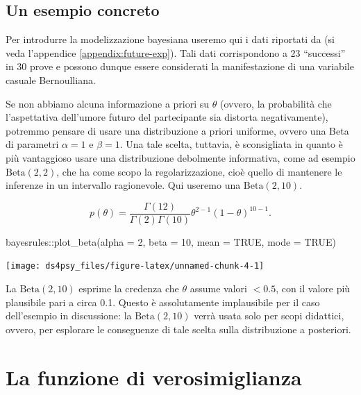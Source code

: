 \documentclass[
  11pt,
]{krantz}
\makeatletter
\newenvironment{Shaded}{\begin{snugshade}}{\end{snugshade}}
\newcommand{\AttributeTok}[1]{\textcolor[rgb]{0.61,0.61,0.61}{#1}}
\newcommand{\ConstantTok}[1]{\textcolor[rgb]{0,0,0}{#1}}
\newcommand{\DecValTok}[1]{\textcolor[rgb]{0.06,0.06,0.06}{#1}}
\newcommand{\FunctionTok}[1]{\textcolor[rgb]{0,0,0}{#1}}
\newcommand{\NormalTok}[1]{#1}
\newcommand{\SpecialCharTok}[1]{\textcolor[rgb]{0,0,0}{#1}}
\newenvironment{kframe}{%
\medskip{}
\setlength{\fboxsep}{.8em}
 \def\at@end@of@kframe{}%
 \ifinner\ifhmode%
  \def\at@end@of@kframe{\end{minipage}}%
  \begin{minipage}{\columnwidth}%
 \fi\fi%
 \def\FrameCommand##1{\hskip\@totalleftmargin \hskip-\fboxsep
 \colorbox{shadecolor}{##1}\hskip-\fboxsep
     \hskip-\linewidth \hskip-\@totalleftmargin \hskip\columnwidth}%
 \MakeFramed {\advance\hsize-\width
   \@totalleftmargin\z@ \linewidth\hsize
   \@setminipage}}%
 {\par\unskip\endMakeFramed%
 \at@end@of@kframe}
\renewenvironment{Shaded}{\begin{kframe}}{\end{kframe}}
\theoremstyle{definition}
\theoremstyle{definition}
\theoremstyle{definition}
\theoremstyle{definition}
\theoremstyle{remark}
\makeatother
\begin{document}
\hypertarget{un-esempio-concreto}{%
\subsection{Un esempio concreto}\label{un-esempio-concreto}}

Per introdurre la modelizzazione bayesiana useremo qui i dati riportati da \citet{zetschefuture2019} (si veda l'appendice \ref{appendix:future-exp}). Tali dati corrispondono a 23 ``successi'' in 30 prove e possono dunque essere considerati la manifestazione di una variabile casuale Bernoulliana.

Se non abbiamo alcuna informazione a priori su \(\theta\) (ovvero, la probabilità che l'aspettativa dell'umore futuro del partecipante sia distorta negativamente), potremmo pensare di usare una distribuzione a priori uniforme, ovvero una Beta di parametri \(\alpha=1\) e \(\beta=1\). Una tale scelta, tuttavia, è sconsigliata in quanto è più vantaggioso usare una distribuzione debolmente informativa, come ad esempio \(\mbox{Beta}(2, 2)\), che ha come scopo la regolarizzazione, cioè quello di mantenere le inferenze in un intervallo ragionevole. Qui useremo una \(\mbox{Beta}(2, 10)\).

\[
p(\theta) = \frac{\Gamma(12)}{\Gamma(2)\Gamma(10)}\theta^{2-1} (1-\theta)^{10-1}.
\]

\begin{Shaded}
\begin{Highlighting}[]
\NormalTok{bayesrules}\SpecialCharTok{::}\FunctionTok{plot\_beta}\NormalTok{(}\AttributeTok{alpha =} \DecValTok{2}\NormalTok{, }\AttributeTok{beta =} \DecValTok{10}\NormalTok{, }\AttributeTok{mean =} \ConstantTok{TRUE}\NormalTok{, }\AttributeTok{mode =} \ConstantTok{TRUE}\NormalTok{)}
\end{Highlighting}
\end{Shaded}

\begin{center}\texttt{[image: ds4psy\_files/figure-latex/unnamed-chunk-4-1]} \end{center}

La \(\mbox{Beta}(2, 10)\) esprime la credenza che \(\theta\) assume valori \(< 0.5\), con il valore più plausibile pari a circa 0.1. Questo è assolutamente implausibile per il caso dell'esempio in discussione: la \(\mbox{Beta}(2, 10)\) verrà usata solo per scopi didattici, ovvero, per esplorare le conseguenze di tale scelta sulla distribuzione a posteriori.

\hypertarget{la-funzione-di-verosimiglianza}{%
\section{La funzione di verosimiglianza}\label{la-funzione-di-verosimiglianza}}
\end{document}
